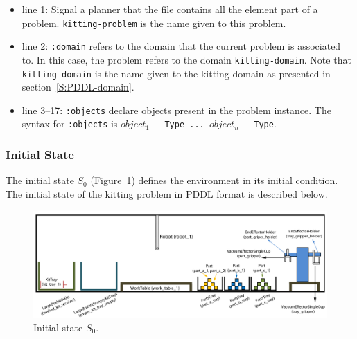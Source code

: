 \begin{itemize}
\item line 1: Signal a planner that the file contains all the element part of a problem. \texttt{kitting-problem} is the name given to this problem.
\item line 2: \texttt{:domain} refers to the domain that the current problem is associated to. In this case, the problem refers to the domain \texttt{kitting-domain}. Note that \texttt{kitting-domain} is the name given to the kitting domain as presented in section~\ref{S:PDDL-domain}.
\item line 3--17: \texttt{:objects} declare objects present in the problem instance. The syntax for \texttt{:objects} is \texttt{$object_1$ - Type ... $object_n$ - Type}.
\end{itemize}

\subsubsection{Initial State}
The initial state $S_0$ (Figure~\ref{fig:s0}) defines the environment in its initial condition. The initial state of the kitting problem in PDDL format is described below.

\begin{figure}[h!t!]
\centering
\includegraphics[width=14cm]{Figure/s0.jpg}
\caption{Initial state $S_0$.}
\label{fig:s0}
\end{figure}

